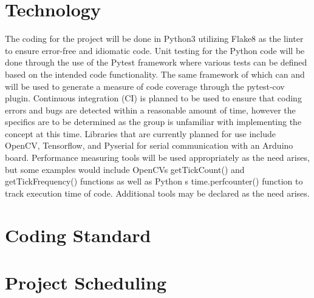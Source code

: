 \documentclass{article}
\begin{document}
\section{Technology}

The coding for the project will be done in Python3 utilizing Flake8 as the linter 
to ensure error-free and idiomatic code. Unit testing for the Python code will be done 
through the use of the Pytest framework where various tests can be defined based on the 
intended code functionality. The same framework of which can and will be used to generate 
a measure of code coverage through the pytest-cov plugin. Continuous integration (CI) is 
planned to be used to ensure that coding errors and bugs are detected within a reasonable 
amount of time, however the specifics are to be determined as the group is unfamiliar with 
implementing the concept at this time. Libraries that are currently planned for use include 
OpenCV, Tensorflow, and Pyserial for serial communication with an Arduino board. Performance 
measuring tools will be used appropriately as the need arises, but some examples would include 
OpenCV\textquotesingle s getTickCount() and getTickFrequency() functions as well as Python\textquotesingle 
s time.perf\textunderscore counter() function to track execution time of code. Additional tools 
may be declared as the need arises.

\section{Coding Standard}

\section{Project Scheduling}

\end{document}
